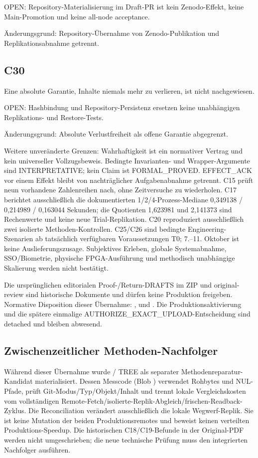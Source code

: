OPEN: Repository-Materialisierung im Draft-PR ist kein Zenodo-Effekt, keine Main-Promotion und keine all-node acceptance.

Änderungsgrund: Repository-Übernahme von Zenodo-Publikation und Replikationsabnahme getrennt.

\subsection{C30}
Eine absolute Garantie, Inhalte niemals mehr zu verlieren, ist nicht nachgewiesen.

OPEN: Hashbindung und Repository-Persistenz ersetzen keine unabhängigen Replikations- und Restore-Tests.

Änderungsgrund: Absolute Verlustfreiheit als offene Garantie abgegrenzt.

Weitere unveränderte Grenzen: Wahrhaftigkeit ist ein normativer Vertrag und kein universeller Vollzugsbeweis. Bedingte Invarianten- und Wrapper-Argumente sind INTERPRETATIVE; kein Claim ist FORMAL\_PROVED. EFFECT\_ACK vor einem Effekt bleibt von nachträglicher Aufgabenabnahme getrennt. C15 prüft neun vorhandene Zahlenreihen nach, ohne Zeitversuche zu wiederholen. C17 berichtet ausschließlich die dokumentierten 1/2/4-Prozess-Mediane 0,349138 / 0,214989 / 0,163044 Sekunden; die Quotienten 1,623981 und 2,141373 sind Rechenwerte und keine neue Trial-Replikation. C20 reproduziert ausschließlich zwei isolierte Methoden-Kontrollen. C25/C26 sind bedingte Engineering-Szenarien ab tatsächlich verfügbaren Voraussetzungen T0; 7.–11. Oktober ist keine Auslieferungszusage. Subjektives Erleben, globale Systemabnahme, SSO/Biometrie, physische FPGA-Ausführung und methodisch unabhängige Skalierung werden nicht bestätigt.

Die ursprünglichen editorialen Proof-/Return-DRAFTS im ZIP und original-review sind historische Dokumente und dürfen keine Produktion freigeben. Normative Disposition dieser Übernahme: ,  und . Die Produktionsaktivierung und die spätere einmalige AUTHORIZE\_EXACT\_UPLOAD-Entscheidung sind detached und bleiben abwesend.

\subsection{Zwischenzeitlicher Methoden-Nachfolger}
Während dieser Übernahme wurde  / TREE  als separater Methodenreparatur-Kandidat materialisiert. Dessen Messcode (Blob ) verwendet Rohbytes und NUL-Pfade, prüft Git-Modus/Typ/Objekt/Inhalt und trennt lokale Vergleichskosten vom vollständigen Remote-Fetch/isolierte-Replik-Abgleich/frischen-Readback-Zyklus. Die Reconciliation verändert ausschließlich die lokale Wegwerf-Replik. Sie ist keine Mutation der beiden Produktionsremotes und beweist keinen verteilten Produktions-Speedup. Die historischen C18/C19-Befunde in der Original-PDF werden nicht umgeschrieben; die neue technische Prüfung muss den integrierten Nachfolger ausführen.

